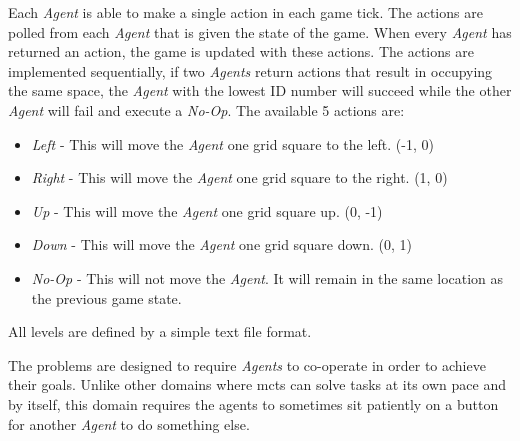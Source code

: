 \documentclass{IEEEtran}
\begin{document}
Each \emph{Agent} is able to make a single action in each game tick. The actions are polled from each \emph{Agent} that is given the state of the game. When every \emph{Agent} has returned an action, the game is updated with these actions. The actions are implemented sequentially, if two \emph{Agents} return actions that result in occupying the same space, the \emph{Agent} with the lowest ID number will succeed while the other \emph{Agent} will fail and execute a \emph{No-Op}. The available 5 actions are:
\begin{itemize}
\item{\emph{Left} - This will move the \emph{Agent} one grid square to the left. (-1, 0)}
\item{\emph{Right} - This will move the \emph{Agent} one grid square to the right. (1, 0)}
\item{\emph{Up} - This will move the \emph{Agent} one grid square up. (0, -1)}
\item{\emph{Down} - This will move the \emph{Agent} one grid square down. (0, 1)}
\item{\emph{No-Op} - This will not move the \emph{Agent}. It will remain in the same location as the previous game state.}
\end{itemize}

All levels are defined by a simple text file format.

The problems are designed to require \emph{Agents} to co-operate in order to achieve their goals. Unlike other domains where \gls{mcts} can solve tasks at its own pace and by itself, this domain requires the agents to sometimes sit patiently on a button for another \emph{Agent} to do something else.
\end{document}
